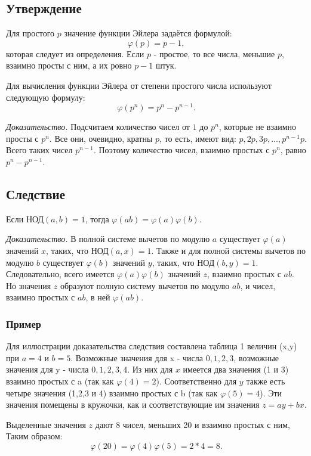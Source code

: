 \documentclass[12pt]{article}
\begin{document}
\subsection{Утверждение} Для простого $p$ значение функции Эйлера задаётся формулой: \[\varphi(p)=p-1,\] которая следует из определения. Если $p$ - простое, то все числа, меньшие $p$, взаимно просты с ним, а их ровно $p-1$ штук.
\par Для вычисления функции Эйлера от степени простого числа используют следующую формулу: \[\varphi(p^{n})=p^{n}-p^{n-1}.\]
\par \textit{Доказательство.} Подсчитаем количество чисел от $1$ до $p^{n}$, которые не взаимно просты с $p^{n}$. Все они, очевидно, кратны $p$, то есть, имеют вид: $p,2p,3p,\dots,p^{n-1}p$. Всего таких чисел $p^{n-1}$. Поэтому количество чисел, взаимно простых с $p^{n}$, равно $p^{n}-p^{n-1}$.

\subsection{Следствие} Если НОД$(a,b)=1$, тогда $\varphi(ab)=\varphi(a)\varphi(b)$.
\par \textit{Доказательство.} В полной системе вычетов по модулю $a$ существует $\varphi(a)$ значений $x$, таких, что НОД$(a,x)=1$. Также и для полной системы вычетов по модулю $b$ существует $\varphi(b)$ значений $y$, таких, что НОД$(b,y)=1$. Следовательно, всего имеется $\varphi(a)\varphi(b)$ значений $z$, взаимно простых с $ab$. Но значения $z$ образуют полную систему вычетов по модулю $ab$, и чисел, взаимно простых с $ab$, в ней $\varphi(ab)$.

\subsubsection{Пример} Для иллюстрации доказательства следствия составлена таблица 1 величин (x,y) при $a=4$ и $b=5$. Возможные значения для x - числа $0,1,2,3$, возможные значения для y - числа $0,1,2,3,4$. Из них для $x$ имеется два значения (1 и 3) взаимно простых с a (так как $\varphi(4)=2$). Соответственно для $y$ также есть четыре значения (1,2,3 и 4) взаимно простых с b (так как $\varphi(5)=4$). Эти значения помещены в кружочки, как и соответствующие им значения $z=ay+bx$.
\par Выделенные значения $z$ дают 8 чисел, меньших 20 и взаимно простых с ним, Таким образом: \[\varphi(20)=\varphi(4)\varphi(5)=2*4=8.\]
\end{document}
